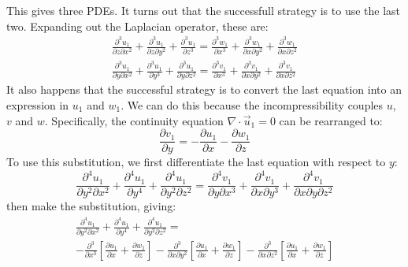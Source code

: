 \documentclass[12pt, a4paper, twoside, openright]{book}
\begin{document}
This gives three PDEs.  It turns out that the successfull strategy is to use the last two. Expanding out the Laplacian operator, these are:
\begin{gather}
\frac{\partial^3 u_1}{\partial z \partial x^2} + \frac{\partial^3 u_1}{\partial z \partial y^2}
+ \frac{\partial^3 u_1}{\partial z^3} =
\frac{\partial^3 w_1}{\partial x^3} + \frac{\partial^3 w_1}{\partial x \partial y^2}
+ \frac{\partial^3 w_1}{\partial x \partial z^2} 
\\
\frac{\partial^3 u_1}{\partial y \partial x^2} + \frac{\partial^3 u_1}{\partial y^3}
+ \frac{\partial^3 u_1}{\partial y \partial z^2} =
\frac{\partial^3 v_1}{\partial x^3} + \frac{\partial^3 v_1}{\partial x \partial y^2}
+ \frac{\partial^3 v_1}{\partial x \partial z^2} 
\end{gather}
It also happens that the successful strategy is to convert the last equation into an expression in $u_1$ and $w_1$.  We can do this because the incompressibility couples $u$, $v$ and $w$.  Specifically, the continuity equation $\nabla \cdot \vec{u}_1 = 0$ can be rearranged to:
\begin{equation}
\frac{\partial v_1}{\partial y} = - \frac{\partial u_1}{\partial x} - \frac{\partial w_1}{\partial z}
\end{equation}
To use this substitution, we first differentiate the last equation with respect to $y$:
\begin{equation}
\frac{\partial^4 u_1}{\partial y^2 \partial x^2} + \frac{\partial^4 u_1}{\partial y^4}
+ \frac{\partial^4 u_1}{\partial y^2 \partial z^2} =
\frac{\partial^4 v_1}{\partial y \partial x^3} + \frac{\partial^4 v_1}{\partial x \partial y^3}
+ \frac{\partial^4 v_1}{\partial x \partial y \partial z^2} 
\end{equation}
then make the substitution, giving:
\begin{multline}
\frac{\partial^4 u_1}{\partial y^2 \partial x^2} + \frac{\partial^4 u_1}{\partial y^4}
+ \frac{\partial^4 u_1}{\partial y^2 \partial z^2} =  \\
- \frac{\partial^3 }{\partial x^3}
 \left[ \frac{\partial u_1}{\partial x} + \frac{\partial w_1}{\partial z} \right] 
- \frac{\partial^3 }{\partial x \partial y^2}
 \left[ \frac{\partial u_1}{\partial x} + \frac{\partial w_1}{\partial z} \right] 
- \frac{\partial^3 }{\partial x \partial z^2}
 \left[ \frac{\partial u_1}{\partial x} + \frac{\partial w_1}{\partial z} \right]  
\end{multline}
\end{document}
